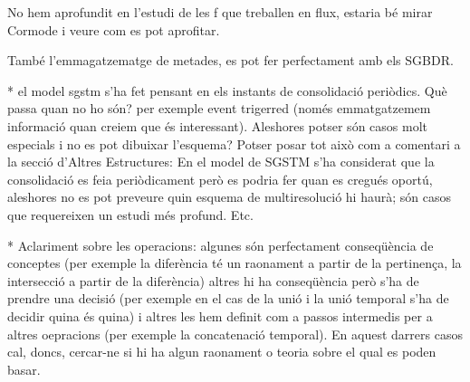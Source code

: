

No hem aprofundit en l'estudi de les f que treballen en flux, estaria bé mirar Cormode i veure com es pot aprofitar.


També l'emmagatzematge de metades, es  pot fer perfectament amb els SGBDR.



* el model sgstm s'ha fet pensant en els instants de consolidació
periòdics. Què passa quan no ho són?  per exemple event trigerred
(només emmatgatzemem informació quan creiem que és
interessant). Aleshores potser són casos molt especials i no es pot
dibuixar l'esquema? Potser posar tot això com a comentari a la secció
d'Altres Estructures: En el model de \gls{SGSTM} s'ha considerat que
la consolidació es feia periòdicament però es podria fer quan es
cregués oportú, aleshores no es pot preveure quin esquema de
multiresolució hi haurà; són casos que requereixen un estudi més
profund. Etc. 




* Aclariment sobre les operacions: algunes són perfectament conseqüència de conceptes (per exemple la diferència té un raonament a partir de la pertinença, la intersecció a partir de la diferència) altres hi ha conseqüència però s'ha de prendre una decisió (per exemple en el cas de la unió i la unió temporal s'ha de decidir quina és quina) i altres les hem definit com a passos intermedis per a altres oepracions (per exemple la concatenació temporal). En aquest darrers casos cal, doncs, cercar-ne si hi ha algun raonament o teoria sobre el qual es poden basar.















